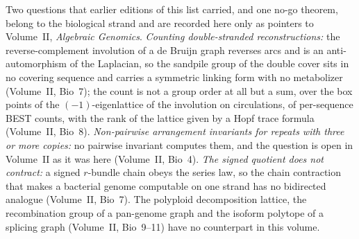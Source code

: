 Two questions that earlier editions of this list carried, and one no-go theorem, belong to
the biological strand and are recorded here only as pointers to Volume~II,
\emph{Algebraic Genomics}. \emph{Counting double-stranded reconstructions:} the
reverse-complement involution of a de Bruijn graph reverses arcs and is an
anti-automorphism of the Laplacian, so the sandpile group of the double cover sits in no
covering sequence and carries a symmetric linking form with no metabolizer (Volume~II,
Bio~7); the count is not a group order at all but a sum, over the box points of the
$(-1)$-eigenlattice of the involution on circulations, of per-sequence BEST counts, with
the rank of the lattice given by a Hopf trace formula (Volume~II, Bio~8). \emph{Non-pairwise
arrangement invariants for repeats with three or more copies:} no pairwise invariant
computes them, and the question is open in Volume~II as it was here (Volume~II, Bio~4).
\emph{The signed quotient does not contract:} a signed $r$-bundle chain obeys the series
law, so the chain contraction that makes a bacterial genome computable on one strand has no
bidirected analogue (Volume~II, Bio~7). The polyploid decomposition lattice, the
recombination group of a pan-genome graph and the isoform polytope of a splicing graph
(Volume~II, Bio~9--11) have no counterpart in this volume.
